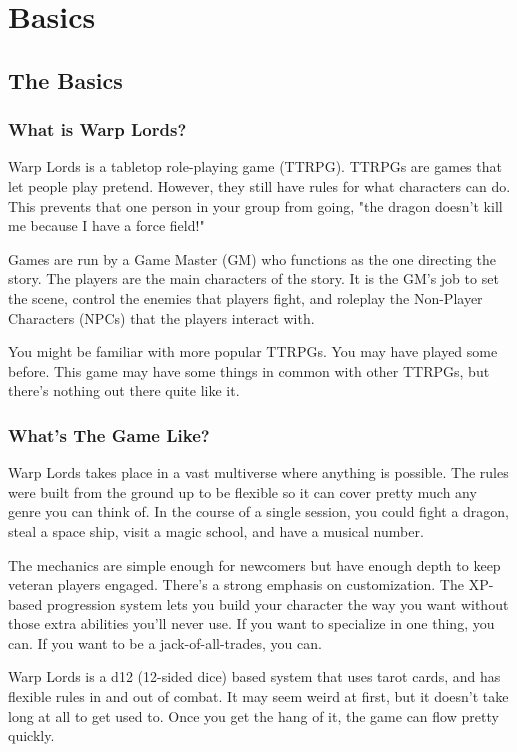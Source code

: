 \chapter{Basics}
\begin{multicols}{2}
\section{The Basics}

\subsection{What is Warp Lords?}
Warp Lords is a tabletop role-playing game (TTRPG). TTRPGs are games that let people play pretend. However, they still have rules for what characters can do. This prevents that one person in your group from going, "the dragon doesn't kill me because I have a force field!"

Games are run by a Game Master (GM) who functions as the one directing the story. The players are the main characters of the story. It is the GM's job to set the scene, control the enemies that players fight, and roleplay the Non-Player Characters (NPCs) that the players interact with.

You might be familiar with more popular TTRPGs. You may have played some before. This game may have some things in common with other TTRPGs, but there's nothing out there quite like it.

\subsection{What’s The Game Like?}
Warp Lords takes place in a vast multiverse where anything is possible. The rules were built from the ground up to be flexible so it can cover pretty much any genre you can think of. In the course of a single session, you could fight a dragon, steal a space ship, visit a magic school, and have a musical number.

The mechanics are simple enough for newcomers but have enough depth to keep veteran players engaged. There's a strong emphasis on customization. The XP-based progression system lets you build your character the way you want without those extra abilities you'll never use. If you want to specialize in one thing, you can. If you want to be a jack-of-all-trades, you can.

Warp Lords is a d12 (12-sided dice) based system that uses tarot cards, and has flexible rules in and out of combat. It may seem weird at first, but it doesn't take long at all to get used to. Once you get the hang of it, the game can flow pretty quickly.


\end{multicols}
